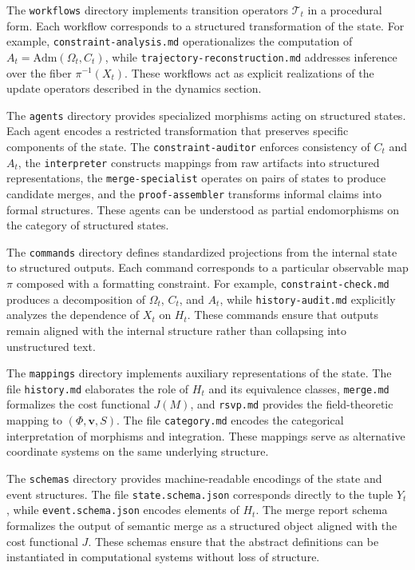 \documentclass[11pt,oneside]{article}
\begin{document}
The \texttt{workflows} directory implements transition operators \( \mathcal{T}_t \) in a procedural form. Each workflow corresponds to a structured transformation of the state. For example, \texttt{constraint-analysis.md} operationalizes the computation of \( A_t = \mathrm{Adm}(\Omega_t, C_t) \), while \texttt{trajectory-reconstruction.md} addresses inference over the fiber \( \pi^{-1}(X_t) \). These workflows act as explicit realizations of the update operators described in the dynamics section.

The \texttt{agents} directory provides specialized morphisms acting on structured states. Each agent encodes a restricted transformation that preserves specific components of the state. The \texttt{constraint-auditor} enforces consistency of \( C_t \) and \( A_t \), the \texttt{interpreter} constructs mappings from raw artifacts into structured representations, the \texttt{merge-specialist} operates on pairs of states to produce candidate merges, and the \texttt{proof-assembler} transforms informal claims into formal structures. These agents can be understood as partial endomorphisms on the category of structured states.

The \texttt{commands} directory defines standardized projections from the internal state to structured outputs. Each command corresponds to a particular observable map \( \pi \) composed with a formatting constraint. For example, \texttt{constraint-check.md} produces a decomposition of \( \Omega_t \), \( C_t \), and \( A_t \), while \texttt{history-audit.md} explicitly analyzes the dependence of \( X_t \) on \( H_t \). These commands ensure that outputs remain aligned with the internal structure rather than collapsing into unstructured text.

The \texttt{mappings} directory implements auxiliary representations of the state. The file \texttt{history.md} elaborates the role of \( H_t \) and its equivalence classes, \texttt{merge.md} formalizes the cost functional \( J(M) \), and \texttt{rsvp.md} provides the field-theoretic mapping to \( (\Phi, \mathbf{v}, S) \). The file \texttt{category.md} encodes the categorical interpretation of morphisms and integration. These mappings serve as alternative coordinate systems on the same underlying structure.

The \texttt{schemas} directory provides machine-readable encodings of the state and event structures. The file \texttt{state.schema.json} corresponds directly to the tuple \( Y_t \), while \texttt{event.schema.json} encodes elements of \( H_t \). The merge report schema formalizes the output of semantic merge as a structured object aligned with the cost functional \( J \). These schemas ensure that the abstract definitions can be instantiated in computational systems without loss of structure.
\end{document}
